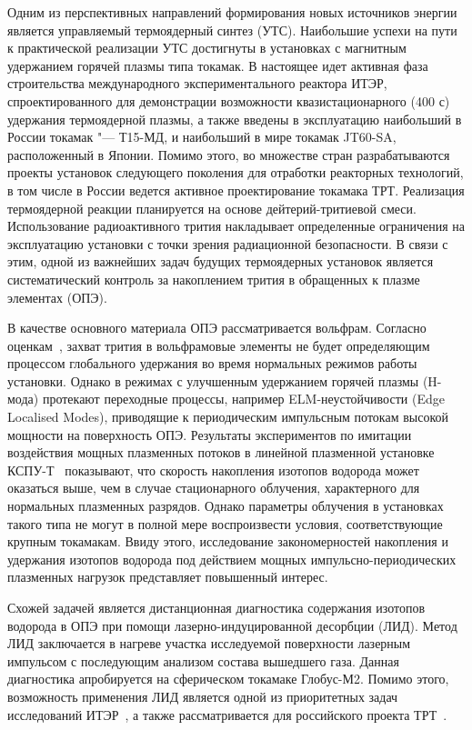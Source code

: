 
{\actuality} Одним из перспективных направлений формирования новых источников энергии является управляемый термоядерный синтез (УТС). 
Наибольшие успехи на пути к практической реализации УТС достигнуты в установках с магнитным удержанием горячей плазмы типа токамак. 
В настоящее идет активная фаза строительства международного экспериментального реактора ИТЭР, спроектированного для демонстрации 
возможности квазистационарного (400 с) удержания термоядерной плазмы, а также введены в эксплуатацию наибольший в России токамак "--- Т15-МД, 
и наибольший в мире токамак JT60-SA, расположенный в Японии. Помимо этого, во множестве стран разрабатываются проекты установок следующего 
поколения для отработки реакторных технологий, в том числе в России ведется активное проектирование токамака ТРТ. Реализация термоядерной реакции 
планируется на основе дейтерий-тритиевой смеси. Использование радиоактивного трития накладывает определенные ограничения на эксплуатацию установки 
с точки зрения радиационной безопасности. В связи с этим, одной из важнейших задач будущих термоядерных установок является систематический контроль 
за накоплением трития в обращенных к плазме элементах (ОПЭ). 
 
 В качестве основного материала ОПЭ рассматривается вольфрам. Согласно оценкам~\cite{Roth1}, захват трития в вольфрамовые элементы не будет определяющим 
 процессом глобального удержания во время нормальных режимов работы установки. Однако в режимах с улучшенным удержанием горячей плазмы (H-мода) протекают 
 переходные процессы, например ELM-неустойчивости (Edge Localised Modes), приводящие к периодическим импульсным потокам высокой мощности на поверхность ОПЭ. 
 Результаты экспериментов по имитации воздействия мощных плазменных потоков в линейной плазменной установке КСПУ-Т~\cite{Ogorodnikova} показывают, что скорость 
 накопления изотопов водорода может оказаться выше, чем в случае стационарного облучения, характерного для нормальных плазменных разрядов. Однако параметры 
 облучения в установках такого типа не могут в полной мере воспроизвести условия, соответствующие крупным токамакам. Ввиду этого, исследование закономерностей 
 накопления и удержания изотопов водорода под действием мощных импульсно-периодических плазменных нагрузок представляет повышенный интерес.
 
Схожей задачей является дистанционная диагностика содержания изотопов водорода в ОПЭ при помощи лазерно-индуцированной десорбции (ЛИД). Метод ЛИД 
заключается в нагреве участка исследуемой поверхности лазерным импульсом с последующим анализом состава вышедшего газа. Данная диагностика апробируется 
на сферическом токамаке Глобус-М2. Помимо этого, возможность применения ЛИД является одной из приоритетных задач исследований ИТЭР~\cite{loarte2020required}, 
а также рассматривается для российского проекта ТРТ~\cite{Razdobarin2022}.

